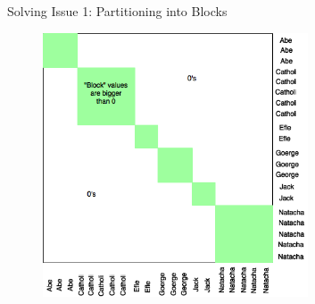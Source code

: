 \documentclass{beamer}
\begin{document}
\begin{frame} {Solving Issue 1: Partitioning into Blocks}


\begin{figure}
   \centering
   \includegraphics[width=0.7\textwidth]{./figures/blocking.png}
\end{figure}









\end{frame}
\end{document}
